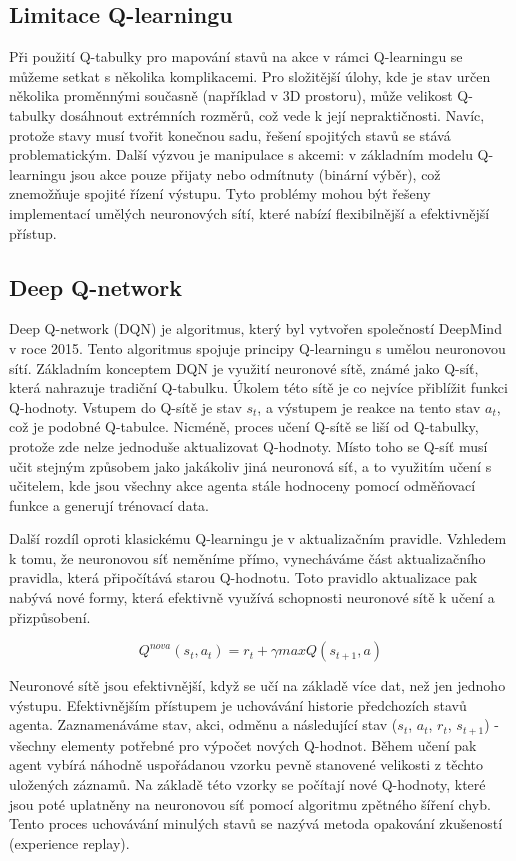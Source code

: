 \documentclass[12pt, a4paper,
twoside,        %
openright
]{report}
\begin{document}
\newpage
\subsection{Limitace Q-learningu}
Při použití Q-tabulky pro mapování stavů na akce v rámci Q-learningu se můžeme setkat s několika komplikacemi. Pro složitější úlohy, kde je stav určen několika proměnnými současně (například v 3D prostoru), může velikost Q-tabulky dosáhnout extrémních rozměrů, což vede k její nepraktičnosti. Navíc, protože stavy musí tvořit konečnou sadu, řešení spojitých stavů se stává problematickým. Další výzvou je manipulace s akcemi: v základním modelu Q-learningu jsou akce pouze přijaty nebo odmítnuty (binární výběr), což znemožňuje spojité řízení výstupu. Tyto problémy mohou být řešeny implementací umělých neuronových sítí, které nabízí flexibilnější a efektivnější přístup.



\newpage
\subsection{Deep Q-network}

Deep Q-network (DQN) je algoritmus, který byl vytvořen společností DeepMind v roce 2015. Tento algoritmus spojuje principy Q-learningu s umělou neuronovou sítí. Základním konceptem DQN je využití neuronové sítě, známé jako Q-síť, která nahrazuje tradiční Q-tabulku. Úkolem této sítě je co nejvíce přiblížit funkci Q-hodnoty. Vstupem do Q-sítě je stav $s_{t}$, a výstupem je reakce na tento stav $a_{t}$, což je podobné Q-tabulce. Nicméně, proces učení Q-sítě se liší od Q-tabulky, protože zde nelze jednoduše aktualizovat Q-hodnoty. Místo toho se Q-síť musí učit stejným způsobem jako jakákoliv jiná neuronová síť, a to využitím učení s učitelem, kde jsou všechny akce agenta stále hodnoceny pomocí odměňovací funkce a generují trénovací data.

Další rozdíl oproti klasickému Q-learningu je v aktualizačním pravidle. Vzhledem k tomu, že neuronovou síť neměníme přímo, vynecháváme část aktualizačního pravidla, která připočítává starou Q-hodnotu. Toto pravidlo aktualizace pak nabývá nové formy, která efektivně využívá schopnosti neuronové sítě k učení a přizpůsobení.

\begin{equation}
  Q^{nova}(s_t,a_t)=r_t+\gamma maxQ(s_{t+1},a)
\end{equation}


Neuronové sítě jsou efektivnější, když se učí na základě více dat, než jen jednoho výstupu. Efektivnějším přístupem je uchovávání historie předchozích stavů agenta. Zaznamenáváme stav, akci, odměnu a následující stav ($s_{t}$, $a_{t}$, $r_{t}$, $s_{t+1}$) - všechny elementy potřebné pro výpočet nových Q-hodnot. Během učení pak agent vybírá náhodně uspořádanou vzorku pevně stanovené velikosti z těchto uložených záznamů. Na základě této vzorky se počítají nové Q-hodnoty, které jsou poté uplatněny na neuronovou síť pomocí algoritmu zpětného šíření chyb. Tento proces uchovávání minulých stavů se nazývá metoda opakování zkušeností (experience replay).
\end{document}
